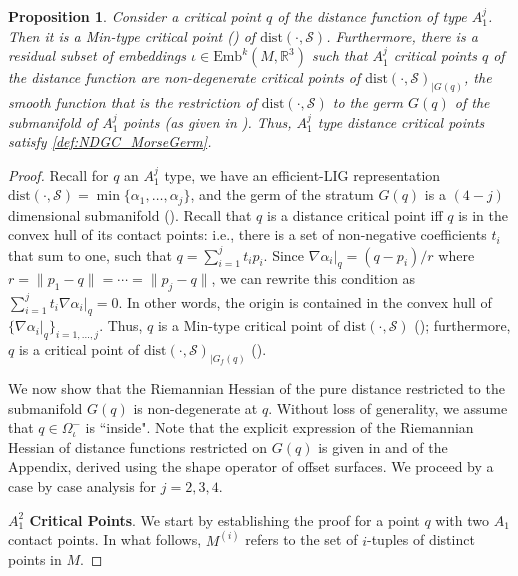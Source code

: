 \documentclass[11pt]{article}
\newcommand{\R}{\mathbb{R}}
\newcommand{\io}{\iota}
\newcommand{\W}{\Omega}
\newcommand{\Emb}{\mathrm{Emb}^k(M,\R^3)}
\newcommand{\dist}{\mathrm{dist}}
\newcommand{\Surf}{\mathcal{S}}
\theoremstyle{plain}
\newtheorem{prop}{Proposition}
\theoremstyle{definition}
\theoremstyle{remark}
\begin{document}
	
	\begin{prop} \label{prop:A1Morse} Consider a critical point $q$ of the distance function of type $A_1^j$. Then it is a Min-type critical point  () of $\dist(\cdot, \Surf)$.  Furthermore, there is a residual subset of embeddings $\io \in \Emb$ such that $A_1^j$ critical points $q$ of the distance function are non-degenerate critical points of $\dist(\cdot, \Surf)_{\rvert G(q)}$, the smooth function that is the restriction of $\dist(\cdot, \Surf)$ to the germ $G(q)$ of the submanifold of $A_1^j$ points (as given in ). Thus, $A_1^j$ type distance critical points satisfy \ref{def:NDGC_MorseGerm}.
	\end{prop}
	\begin{proof}
		Recall for $q$ an $A_1^j$ type, we have an efficient-LIG representation $\dist(\cdot, \Surf) = \min\{\alpha_1, \ldots, \alpha_j\}$, and the germ of the stratum $G(q)$ is a $(4-j)$ dimensional submanifold (). Recall  that $q$ is a distance critical point iff $q$ is in the convex hull of its contact points: i.e., there is a set of non-negative coefficients $t_i$ that sum to one, such that $q = \sum_{i=1}^j t_i p_i$. Since $\nabla \alpha_i \rvert_{q} = (q-p_i)/r$ where $r = \|p_1 - q \| = \cdots = \|p_j - q \|$, we can rewrite this condition as $\sum_{i=1}^j t_i \nabla \alpha_i \rvert_{q} = 0$. In other words, the origin is contained in the convex hull of $\{ \nabla \alpha_i\rvert_q\}_{i = 1,\ldots,j}$. Thus, $q$ is a Min-type critical point of $\dist(\cdot, \Surf)$ (); furthermore, $q$ is a critical point of  $\dist(\cdot, \Surf)_{\lvert G_f(q)}$ (). 
		
		We now show that the Riemannian Hessian of the pure distance restricted to the submanifold $G(q)$ is non-degenerate at $q$. 
		Without loss of generality, we assume that $q \in \W_\io^-$ is ``inside".
		Note that the explicit expression of the Riemannian Hessian of distance functions restricted on $G(q)$ is given in   and  of the Appendix, derived using the shape operator of offset surfaces. We proceed by a case by case analysis for $j = 2,3,4$. 
		
		
		\textbf{$A_1^2$ Critical Points}. We start by establishing the proof for a point $q$ with two $A_1$ contact points. In what follows, $M^{(i)}$ refers to the set of $i$-tuples of distinct points in $M$.
		

\end{proof}
\end{document}
